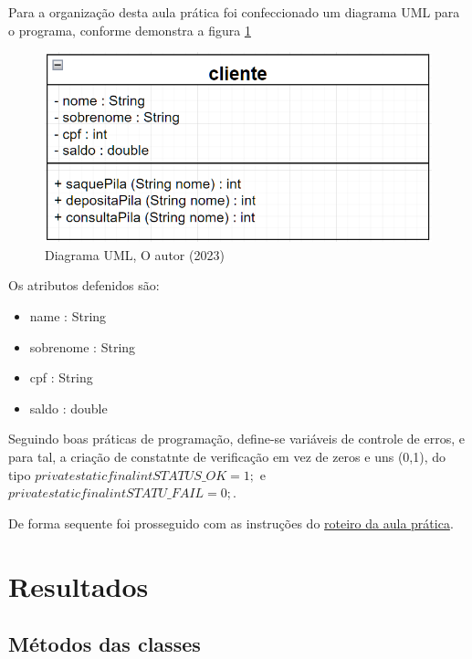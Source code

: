 \newpage


\par Para a organização desta aula prática foi confeccionado um diagrama UML para o programa, conforme demonstra a figura \ref{fig:uml}

\begin{figure}[h!]
  \includegraphics[width=\textwidth]{figure/uml_classe.png}
  \caption{Diagrama UML, O autor (2023)}
  \label{fig:uml}
\end{figure}
\newpage
\par Os atributos defenidos são:
\begin{itemize}
  \item name : String
  \item sobrenome : String
  \item cpf : String
  \item saldo : double
\end{itemize}

\par Seguindo boas práticas de programação, define-se variáveis de controle de erros, e para tal, a criação de constatnte de verificação em vez de zeros e uns (0,1), do tipo $private static final int  STATUS\_OK = 1;$ e $private static final int STATU\_FAIL = 0;$.
\par De forma sequente foi prosseguido com as instruções do \href{https://github.com/OgliariNatan/gerenciaBanco/blob/main/Aula%20pr%C3%A1tica.pdf}{roteiro da aula prática}.

\section{Resultados}






\subsection{Métodos das classes}

